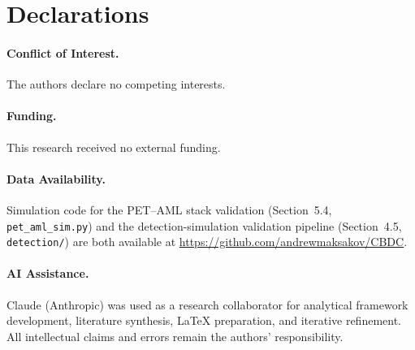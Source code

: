 \documentclass[11pt]{article}
\begin{document}

\section*{Declarations}

\paragraph{Conflict of Interest.} The authors declare no competing interests.

\paragraph{Funding.} This research received no external funding.

\paragraph{Data Availability.} Simulation code for the PET--AML stack
validation (Section~5.4, \texttt{pet\_aml\_sim.py}) and the
detection-simulation validation pipeline (Section~4.5, \texttt{detection/})
are both available at
\url{https://github.com/andrewmaksakov/CBDC}.

\paragraph{AI Assistance.} Claude (Anthropic) was used as a research
collaborator for analytical framework development, literature synthesis,
LaTeX preparation, and iterative refinement. All intellectual claims and
errors remain the authors' responsibility.


\clearpage


\end{document}
